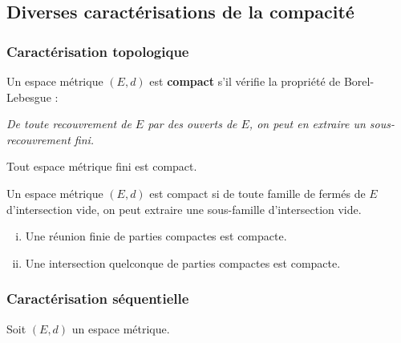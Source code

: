 




	\subsection{Diverses caractérisations de la compacité}

	\subsubsection{Caractérisation topologique}


	\begin{definition}
		Un espace métrique $(E, d)$ est \textbf{compact} s'il vérifie la propriété de Borel-Lebesgue :
		\begin{center}
			\textit{De toute recouvrement de $E$ par des ouverts de $E$, on peut en extraire un sous-recouvrement fini.}
		\end{center}
	\end{definition}

	\begin{example}
		Tout espace métrique fini est compact.
	\end{example}

	\begin{proposition}
		Un espace métrique $(E, d)$ est compact si de toute famille de fermés de $E$ d'intersection vide, on peut extraire une sous-famille d'intersection vide.
	\end{proposition}

	\begin{proposition}
		\begin{enumerate}[(i)]
			\item Une réunion finie de parties compactes est compacte.
			\item Une intersection quelconque de parties compactes est compacte.
		\end{enumerate}
	\end{proposition}

	\subsubsection{Caractérisation séquentielle}


	Soit $(E,d)$ un espace métrique.

